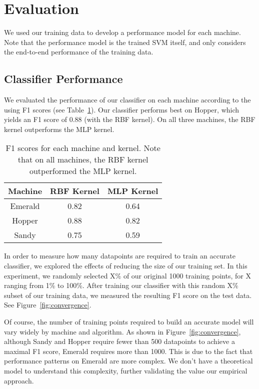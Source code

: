 \section{Evaluation}
\label{s:evaluation}
We used our training data to develop a performance model for each machine.
Note that the performance model is the trained SVM itself, and only considers the end-to-end performance of the training data.

\subsection{Classifier Performance}
We evaluated the performance of our classifier on each machine according to the 
using F1 scores (see Table~\ref{t:F1_scores}).
Our classifier performs best on Hopper, which yields an F1 score of 0.88 (with the RBF kernel).
On all three machines, the RBF kernel outperforms the MLP kernel.

\begin{table}[t]
    \begin{center}
        \begin{tabular}{c|c|c}
            Machine & RBF Kernel & MLP Kernel \\ \hline
            Emerald & 0.82 & 0.64 \\
            Hopper & 0.88 & 0.82 \\
            Sandy & 0.75 & 0.59 \\
        \end{tabular}
    \end{center}
    \caption{F1 scores for each machine and kernel. Note that on all machines, the RBF kernel outperformed the MLP kernel.}
    \label{t:F1_scores}
\end{table}

In order to measure how many datapoints are required to train an accurate classifier, we explored the effects of reducing the size of our training set.
In this experiment, we randomly selected X\% of our original 1000 training points, for X ranging from 1\% to 100\%.
After training our classifier with this random X\% subset of our training data, we measured the resulting F1 score on the test data. See Figure~\ref{fig:convergence}.


Of course, the number of training points required to build an accurate model will vary widely by machine and algorithm.
As shown in Figure~\ref{fig:convergence}, although Sandy and Hopper require fewer than 500 datapoints to achieve a maximal F1 score, Emerald requires more than 1000.
This is due to the fact that performance patterns on Emerald are more complex.
We don't have a theoretical model to understand this complexity, further validating the value our empirical approach.


